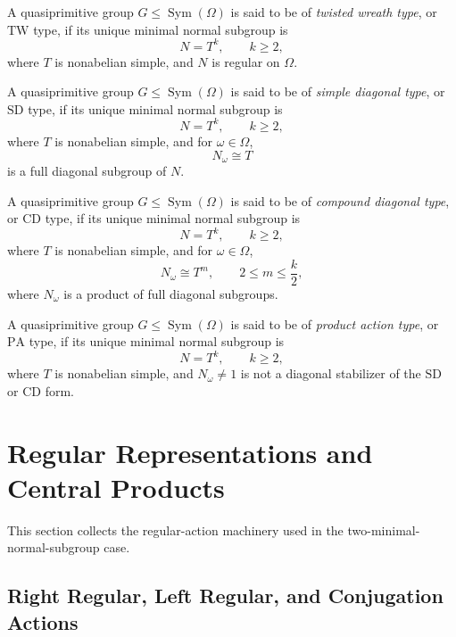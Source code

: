 \begin{definition}[TW type]
A quasiprimitive group \(G\leq \operatorname{Sym}(\Omega)\) is said to be of
\emph{twisted wreath type}, or \(\mathrm{TW}\) type, if its unique minimal normal subgroup is
\[
    N=T^k,\qquad k\geq 2,
\]
where \(T\) is nonabelian simple, and \(N\) is regular on \(\Omega\).
\end{definition}

\begin{definition}[SD type]
A quasiprimitive group \(G\leq \operatorname{Sym}(\Omega)\) is said to be of
\emph{simple diagonal type}, or \(\mathrm{SD}\) type, if its unique minimal normal subgroup is
\[
    N=T^k,\qquad k\geq 2,
\]
where \(T\) is nonabelian simple, and for \(\omega\in\Omega\),
\[
    N_\omega\cong T
\]
is a full diagonal subgroup of \(N\).
\end{definition}

\begin{definition}[CD type]
A quasiprimitive group \(G\leq \operatorname{Sym}(\Omega)\) is said to be of
\emph{compound diagonal type}, or \(\mathrm{CD}\) type, if its unique minimal normal subgroup is
\[
    N=T^k,\qquad k\geq 2,
\]
where \(T\) is nonabelian simple, and for \(\omega\in\Omega\),
\[
    N_\omega\cong T^m,\qquad 2\leq m\leq \frac{k}{2},
\]
where \(N_\omega\) is a product of full diagonal subgroups.
\end{definition}

\begin{definition}[PA type]
A quasiprimitive group \(G\leq \operatorname{Sym}(\Omega)\) is said to be of
\emph{product action type}, or \(\mathrm{PA}\) type, if its unique minimal normal subgroup is
\[
    N=T^k,\qquad k\geq 2,
\]
where \(T\) is nonabelian simple, and \(N_\omega\neq 1\) is not a diagonal stabilizer of
the \(\mathrm{SD}\) or \(\mathrm{CD}\) form.
\end{definition}

\section{Regular Representations and Central Products}

This section collects the regular-action machinery used in the two-minimal-normal-subgroup
case.

\subsection{Right Regular, Left Regular, and Conjugation Actions}

